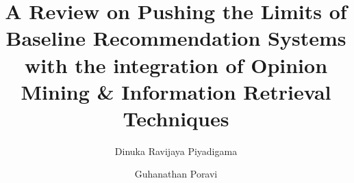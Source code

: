 \documentclass[manuscript,screen,review]{acmart}
\begin{document}
\title{A Review on Pushing the Limits of Baseline Recommendation Systems with the integration of Opinion Mining \& Information Retrieval Techniques}

\author{Dinuka Ravijaya Piyadigama}

\author{Guhanathan Poravi}

\end{document}
